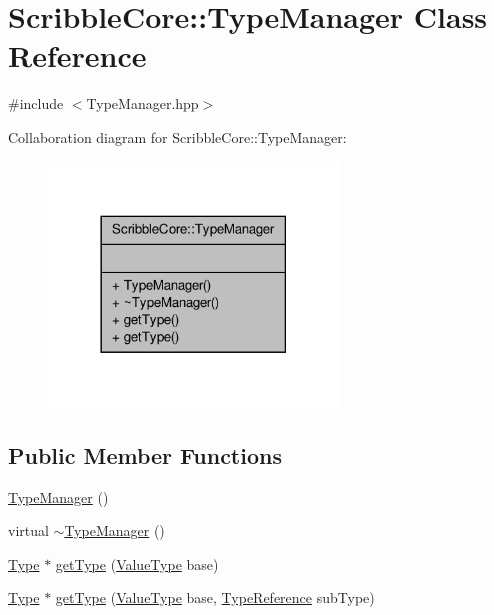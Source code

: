 \hypertarget{class_scribble_core_1_1_type_manager}{\section{Scribble\-Core\-:\-:Type\-Manager Class Reference}
\label{class_scribble_core_1_1_type_manager}
}


{\ttfamily \#include $<$Type\-Manager.\-hpp$>$}



Collaboration diagram for Scribble\-Core\-:\-:Type\-Manager\-:
\nopagebreak
\begin{figure}[H]
\begin{center}
\leavevmode
\includegraphics[width=218pt]{class_scribble_core_1_1_type_manager__coll__graph}
\end{center}
\end{figure}
\subsection*{Public Member Functions}
\begin{DoxyCompactItemize}
\item 
\hyperlink{class_scribble_core_1_1_type_manager_aea8597f79936332c144e7fca0d8aef86}{Type\-Manager} ()
\item 
virtual \hyperlink{class_scribble_core_1_1_type_manager_aa314e54680b633a2af3cfe61eef99b2e}{$\sim$\-Type\-Manager} ()
\item 
\hyperlink{class_scribble_core_1_1_type}{Type} $\ast$ \hyperlink{class_scribble_core_1_1_type_manager_af8c5c47c0b35d90522cf8ce8ab136097}{get\-Type} (\hyperlink{namespace_scribble_core_a0727ed627ce26b81336440a5edecebfb}{Value\-Type} base)
\item 
\hyperlink{class_scribble_core_1_1_type}{Type} $\ast$ \hyperlink{class_scribble_core_1_1_type_manager_a12c0710b3d5bba41da760c85346d2a75}{get\-Type} (\hyperlink{namespace_scribble_core_a0727ed627ce26b81336440a5edecebfb}{Value\-Type} base, \hyperlink{namespace_scribble_core_a0e685a305b14aa5f0504df1369ba270b}{Type\-Reference} sub\-Type)
\end{DoxyCompactItemize}


